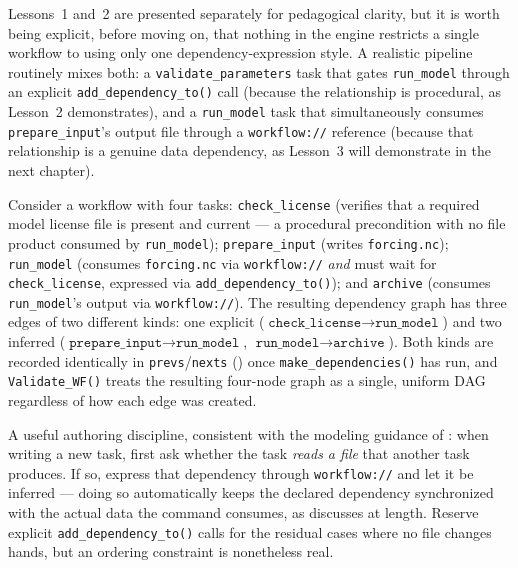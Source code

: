 Lessons~1 and~2 are presented separately for pedagogical clarity, but it is
worth being explicit, before moving on, that nothing in the engine restricts
a single workflow to using only one dependency-expression style. A realistic
pipeline routinely mixes both: a \texttt{validate\_parameters} task that
gates \texttt{run\_model} through an explicit \texttt{add\_dependency\_to()}
call (because the relationship is procedural, as Lesson~2 demonstrates), and
a \texttt{run\_model} task that simultaneously consumes
\texttt{prepare\_input}'s output file through a \texttt{workflow://}
reference (because that relationship is a genuine data dependency, as
Lesson~3 will demonstrate in the next chapter).

\begin{example}
Consider a workflow with four tasks: \texttt{check\_license} (verifies that a
required model license file is present and current --- a procedural
precondition with no file product consumed by \texttt{run\_model});
\texttt{prepare\_input} (writes \texttt{forcing.nc}); \texttt{run\_model}
(consumes \texttt{forcing.nc} via \texttt{workflow://} \emph{and} must wait
for \texttt{check\_license}, expressed via \texttt{add\_dependency\_to()});
and \texttt{archive} (consumes \texttt{run\_model}'s output via
\texttt{workflow://}). The resulting dependency graph has three edges of two
different kinds: one explicit ($\texttt{check\_license} \to
\texttt{run\_model}$) and two inferred ($\texttt{prepare\_input} \to
\texttt{run\_model}$, $\texttt{run\_model} \to \texttt{archive}$). Both
kinds are recorded identically in \texttt{prevs}/\texttt{nexts}
() once \texttt{make\_dependencies()} has run, and
\texttt{Validate\_WF()} treats the resulting four-node graph as a single,
uniform DAG regardless of how each edge was created.
\end{example}

\begin{practicebox}
A useful authoring discipline, consistent with the modeling guidance of
: when writing a new task, first ask whether the task
\emph{reads a file} that another task produces. If so, express that
dependency through \texttt{workflow://} and let it be inferred --- doing so
automatically keeps the declared dependency synchronized with the actual
data the command consumes, as  discusses at length. Reserve
explicit \texttt{add\_dependency\_to()} calls for the residual cases where no
file changes hands, but an ordering constraint is nonetheless real.
\end{practicebox}

